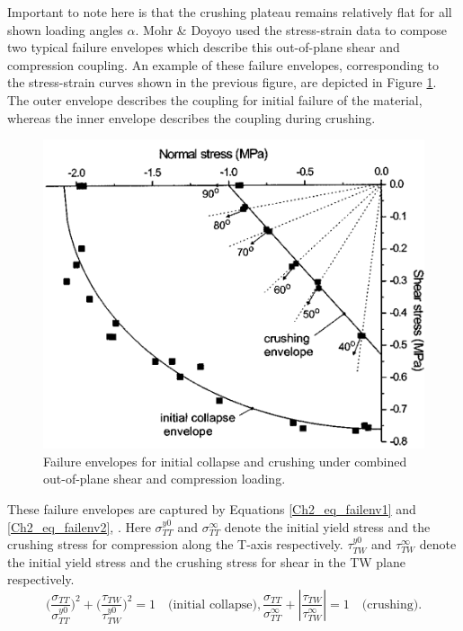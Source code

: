 Important to note here is that the crushing plateau remains relatively flat for all shown loading angles $\alpha$. Mohr \& Doyoyo used the stress-strain data to compose two typical failure envelopes which describe this out-of-plane shear and compression coupling. An example of these failure envelopes, corresponding to the stress-strain curves shown in the previous figure, are depicted in Figure \ref{Ch2_failenvelope}. The outer envelope describes the coupling for initial failure of the material, whereas the inner envelope describes the coupling during crushing.
\begin{figure}[H]
    \centering
    \includegraphics[width=0.55\linewidth]{./Images/Ch2/Ch2_failuremap.PNG}
    \caption{Failure envelopes for initial collapse and crushing under combined out-of-plane shear and compression loading. \cite{mohrdoyoyo2004b}}
    \label{Ch2_failenvelope}
\end{figure}
These failure envelopes are captured by Equations \ref{Ch2_eq_failenv1} and \ref{Ch2_eq_failenv2}, \cite{mohrdoyoyo2004b}. Here $\sigma_{TT}^{y0}$ and $\sigma_{TT}^{\infty}$ denote the initial yield stress and the crushing stress for compression along the T-axis respectively. $\tau_{TW}^{y0}$ and $\tau_{TW}^{\infty}$ denote the initial yield stress and the crushing stress for shear in the TW plane respectively. 
\begin{subequations}
\begin{equation}
    \Big(\frac{\sigma_{TT}}{\sigma^{y0}_{TT}}\Big)^2+\Big(\frac{\tau_{TW}}{\tau^{y0}_{TW}}\Big)^2 = 1 \quad \text{(initial collapse)},
    \label{Ch2_eq_failenv1}
\end{equation}
\begin{equation}
    \frac{\sigma_{TT}}{\sigma^{\infty}_{TT}} + \left| \frac{\tau_{TW}}{\tau^{\infty}_{TW}}\right| = 1  \quad \text{(crushing)}.
    \label{Ch2_eq_failenv2}
\end{equation}
\label{Ch2_eq_failenv}
\end{subequations}
{\color{red}{Bruggetje naar volgende hoofdstuk}}
